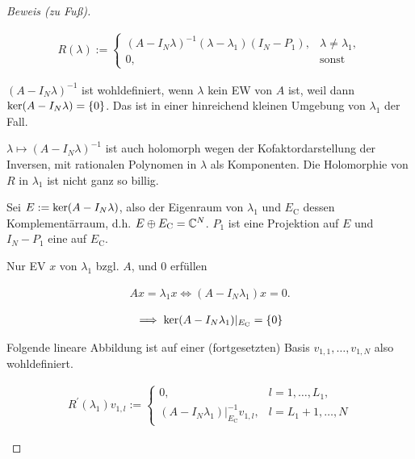 \begin{proof}[Beweis (zu Fuß)]
\begin{enumerate}[label = (\roman*)]
        \begin{align*}
            R(\lambda)
            :=
            \begin{cases}
                (A - I_N \lambda)^{-1} (\lambda - \lambda_1) (I_N - P_1), & \lambda \neq \lambda_1, \\
                0,                                                        & \text{sonst}
            \end{cases}
        \end{align*}

        $(A - I_N \lambda)^{-1}$ ist wohldefiniert, wenn $\lambda$ kein EW von $A$ ist, weil dann $\operatorname{ker}(A - I_N \lambda) = {\left \{ 0 \right \}}$.
        Das ist in einer hinreichend kleinen Umgebung von $\lambda_1$ der Fall.

        $\lambda \mapsto (A - I_N \lambda)^{-1}$ ist auch holomorph wegen der Kofaktordarstellung der Inversen, mit rationalen Polynomen in $\lambda$ als Komponenten.
        Die Holomorphie von $R$ in $\lambda_1$ ist nicht ganz so billig.

        Sei $E := \operatorname{ker}(A - I_N \lambda)$, also der Eigenraum von $\lambda_1$ und $E_\mathrm{C}$ dessen Komplementärraum, d.h. $E \oplus E_\mathrm{C} = \mathbb{C}^N$.
        $P_1$ ist eine Projektion auf $E$ und $I_N - P_1$ eine auf $E_\mathrm{C}$.

        Nur EV $x$ von $\lambda_1$ bzgl. $A$, und $0$ erfüllen

        \begin{align*}
            A x = \lambda_1 x
            \iff
            (A - I_N \lambda_1) x = 0.
        \end{align*}

        \begin{align*}
            \implies
            \operatorname{ker}(A - I_N \lambda_1) |_{E_\mathrm{C}} = {\left \{ 0 \right \}}
        \end{align*}

        Folgende lineare Abbildung ist auf einer (fortgesetzten) Basis $v_{1, 1}, \dots, v_{1, N}$ also wohldefiniert.

        \begin{align*}
            R^\prime(\lambda_1) v_{1, l}
            :=
            \begin{cases}
                0,                                                  & l = 1,       \dots, L_1, \\
                (A - I_N \lambda_1) |_{E_\mathrm{C}}^{-1} v_{1, l}, & l = L_1 + 1, \dots, N
            \end{cases}
        \end{align*}


\end{enumerate}
\end{proof}
